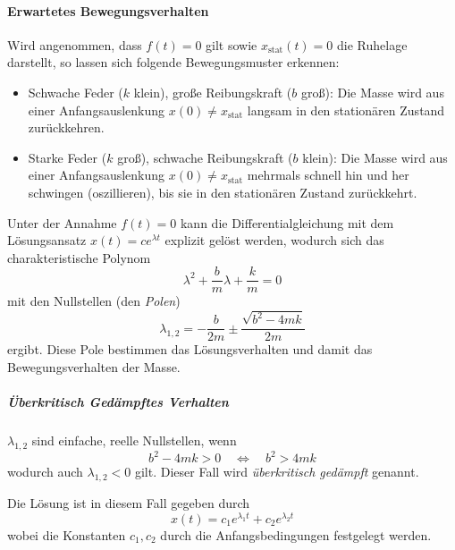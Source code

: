 				\paragraph{Erwartetes Bewegungsverhalten}
					Wird angenommen, dass \( f(t) = 0 \) gilt sowie \( x_\text{stat}(t) = 0 \) die Ruhelage darstellt, so lassen sich folgende Bewegungsmuster erkennen:
					\begin{itemize}
						\item Schwache Feder (\(k\) klein), große Reibungskraft (\(b\) groß): Die Masse wird aus einer Anfangsauslenkung \( x(0) \neq x_\text{stat} \) langsam in den stationären Zustand zurückkehren.
						\item Starke Feder (\(k\) groß), schwache Reibungskraft (\(b\) klein): Die Masse wird aus einer Anfangsauslenkung \( x(0) \neq x_\text{stat} \) mehrmals schnell hin und her schwingen (oszillieren), bis sie in den stationären Zustand zurückkehrt.
					\end{itemize}
				
					Unter der Annahme \( f(t) = 0 \) kann die Differentialgleichung mit dem Lösungsansatz \( x(t) = ce^{\lambda t} \) explizit gelöst werden, wodurch sich das charakteristische Polynom
					\begin{equation*}
						\lambda^2 + \frac{b}{m} \lambda + \frac{k}{m} = 0
					\end{equation*}
					mit den Nullstellen (den \emph{Polen})
					\begin{equation*}
						\lambda_{1, 2} = -\frac{b}{2m} \pm \frac{\sqrt{b^2 - 4mk}}{2m}
					\end{equation*}
					ergibt. Diese Pole bestimmen das Lösungsverhalten und damit das Bewegungsverhalten der Masse.
					
					\subparagraph{Überkritisch Gedämpftes Verhalten}
						\( \lambda_{1, 2} \) sind einfache, reelle Nullstellen, wenn
						\begin{equation*}
							b^2 - 4mk > 0 \quad\iff\quad b^2 > 4mk
						\end{equation*}
						wodurch auch \( \lambda_{1, 2} < 0 \) gilt. Dieser Fall wird \emph{überkritisch gedämpft} genannt.
						
						Die Lösung ist in diesem Fall gegeben durch
						\begin{equation*}
							x(t) = c_1 e^{\lambda_1 t} + c_2 e^{\lambda_2 t}
						\end{equation*}
						wobei die Konstanten \( c_1, c_2 \) durch die Anfangsbedingungen festgelegt werden.
					
